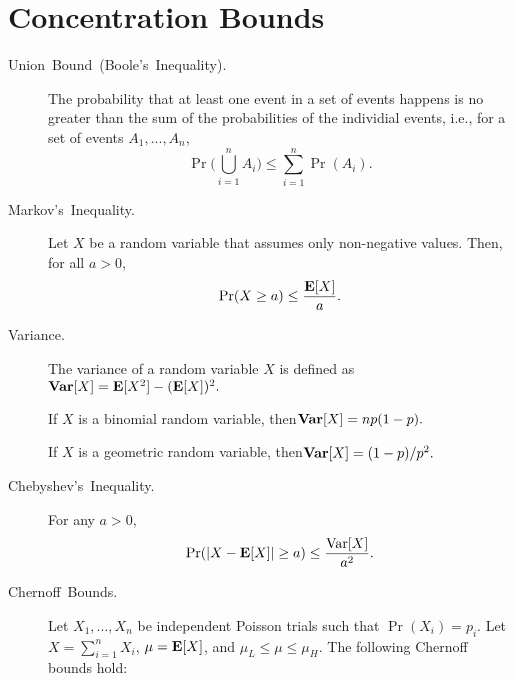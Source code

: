\documentclass[11pt]{article}
\theoremstyle{mytheoremstyle}
\begin{document}
\section*{Concentration Bounds}
\begin{description}
	\item [{Union~Bound~(Boole's~Inequality).}] The probability that at
	least one event in a set of events happens is no greater than the
	sum of the probabilities of the individial events, i.e., for a set
	of events $A_{1},...,A_{n}$,
	\[
	\Pr\Big(\bigcup_{i=1}^{n}A_{i}\Big)\leq\sum_{i=1}^{n}\Pr(A_{i}).
	\]
	\item [{Markov's~Inequality.}] Let $X$ be a random variable that assumes
	only non-negative values. Then, for all $a>0$,
	\[
	\Pr(X\geq a)\leq\frac{\mathrm{\mathbf{E}}[X]}{a}.
	\]
	\item [{Variance.}] The variance of a random variable $X$ is defined as\enspace{}$\mathrm{\mathbf{Var}}[X]=\mathrm{\mathbf{E}}[X^{2}]-(\mathrm{\mathbf{E}}[X])^{2}.$
	
	If $X$ is a binomial random variable, then\enspace{}$\mathrm{\mathbf{Var}}[X]=np(1-p).$
	
	If $X$ is a geometric random variable, then\enspace{}$\mathrm{\mathbf{Var}}[X]=(1-p)/p^{2}.$
	\item [{Chebyshev's~Inequality.}] For any $a>0$,
	\[
	\Pr(|X-\mathrm{\mathbf{E}}[X]|\geq a)\leq\frac{\mathrm{Var}[X]}{a^{2}}.
	\]
	\item [{Chernoff~Bounds.}] Let $X_{1},...,X_{n}$ be independent Poisson
	trials such that $\Pr(X_{i})=p_{i}$. Let $X=\sum_{i=1}^{n}X_{i}$,
	$\mu=\mathrm{\mathbf{E}}[X]$, and $\mu_{L}\leq\mu\leq\mu_{H}$. The following Chernoff
	bounds hold:
	

\end{description}
\end{document}
